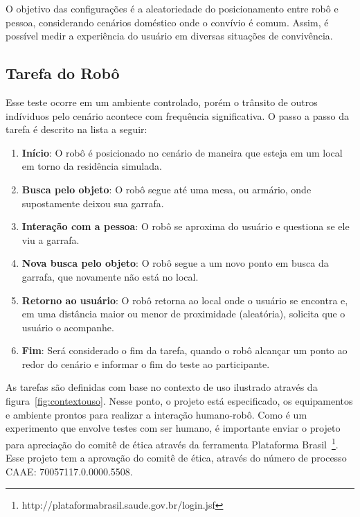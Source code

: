 O objetivo das configurações é a aleatoriedade do posicionamento entre robô e pessoa, considerando cenários doméstico onde o convívio é comum. Assim, é possível medir a experiência do usuário em diversas situações de convivência.

\subsection{Tarefa do Robô}

Esse teste ocorre em um ambiente controlado, porém o trânsito de outros indíviduos pelo cenário acontece com frequência significativa. O passo a passo da tarefa é descrito na lista a seguir:

\begin{enumerate}
	\item \textbf{Início}: O robô é posicionado no cenário de maneira que esteja em um local em torno da residência simulada.
	\item \textbf{Busca pelo objeto}: O robô segue até uma mesa, ou armário, onde supostamente deixou sua garrafa.
	\item \textbf{Interação com a pessoa}: O robô se aproxima do usuário e questiona se ele viu a garrafa.
	\item \textbf{Nova busca pelo objeto}: O robô segue a um novo ponto em busca da garrafa, que novamente não está no local.
	\item \textbf{Retorno ao usuário}: O robô retorna ao local onde o usuário se encontra e, em uma distância maior ou menor de proximidade (aleatória), solicita que o usuário o acompanhe.
	\item \textbf{Fim}: Será considerado o fim da tarefa, quando o robô alcançar um ponto ao redor do cenário e informar o fim do teste ao participante.
\end{enumerate}

As tarefas são definidas com base no contexto de uso ilustrado através da figura~\ref{fig:contextouso}. Nesse ponto, o projeto está especificado, os equipamentos e ambiente prontos para realizar a interação humano-robô. Como é um experimento que envolve testes com ser humano, é importante enviar o projeto para apreciação do comitê de ética através da ferramenta Plataforma Brasil~\footnote{http://plataformabrasil.saude.gov.br/login.jsf}. Esse projeto tem a aprovação do comitê de ética, através do número de processo CAAE: 70057117.0.0000.5508.

